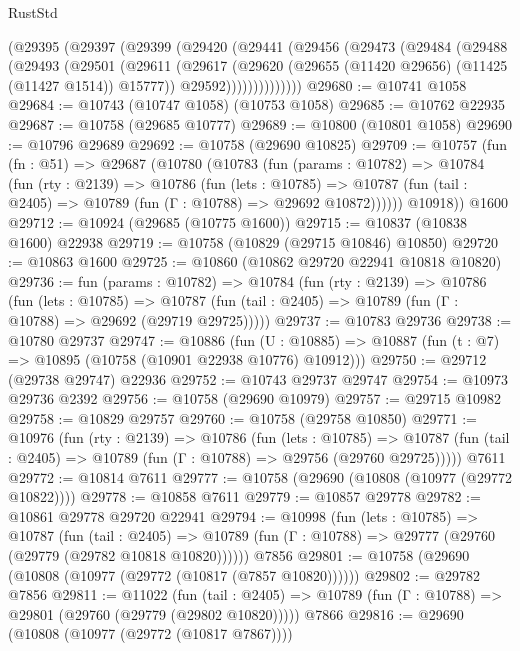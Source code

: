 \begin{lexlean}{RustStd}
\begin{coremodule}
      (@29395
        (@29397
          (@29399
            (@29420
              (@29441
                (@29456
                  (@29473
                    (@29484
                      (@29488
                        (@29493
                          (@29501
                            (@29611
                              (@29617
                                (@29620 (@29655 (@11420 @29656) (@11425 (@11427 @1514)) @15777))
                                @29592))))))))))))))
@29680 := @10741 @1058
@29684 := @10743 (@10747 @1058) (@10753 @1058)
@29685 := @10762 @22935
@29687 := @10758 (@29685 @10777)
@29689 := @10800 (@10801 @1058)
@29690 := @10796 @29689
@29692 := @10758 (@29690 @10825)
@29709 := @10757
    (fun (fn : @51) =>
    @29687
      (@10780
        (@10783
          (fun (params : @10782) =>
          @10784
            (fun (rty : @2139) =>
            @10786
              (fun (lets : @10785) =>
              @10787 (fun (tail : @2405) => @10789 (fun (Γ : @10788) => @29692 @10872))))))
        @10918))
    @1600
@29712 := @10924 (@29685 (@10775 @1600))
@29715 := @10837 (@10838 @1600) @22938
@29719 := @10758 (@10829 (@29715 @10846) @10850)
@29720 := @10863 @1600
@29725 := @10860 (@10862 @29720 @22941 @10818 @10820)
@29736 := fun (params : @10782) =>
  @10784
    (fun (rty : @2139) =>
    @10786
      (fun (lets : @10785) =>
      @10787 (fun (tail : @2405) => @10789 (fun (Γ : @10788) => @29692 (@29719 @29725)))))
@29737 := @10783 @29736
@29738 := @10780 @29737
@29747 := @10886
    (fun (U : @10885) => @10887 (fun (t : @7) => @10895 (@10758 (@10901 @22938 @10776) @10912)))
@29750 := @29712 (@29738 @29747) @22936
@29752 := @10743 @29737 @29747
@29754 := @10973 @29736 @2392
@29756 := @10758 (@29690 @10979)
@29757 := @29715 @10982
@29758 := @10829 @29757
@29760 := @10758 (@29758 @10850)
@29771 := @10976
    (fun (rty : @2139) =>
    @10786
      (fun (lets : @10785) =>
      @10787 (fun (tail : @2405) => @10789 (fun (Γ : @10788) => @29756 (@29760 @29725)))))
    @7611
@29772 := @10814 @7611
@29777 := @10758 (@29690 (@10808 (@10977 (@29772 @10822))))
@29778 := @10858 @7611
@29779 := @10857 @29778
@29782 := @10861 @29778 @29720 @22941
@29794 := @10998
    (fun (lets : @10785) =>
    @10787
      (fun (tail : @2405) =>
      @10789 (fun (Γ : @10788) => @29777 (@29760 (@29779 (@29782 @10818 @10820))))))
    @7856
@29801 := @10758 (@29690 (@10808 (@10977 (@29772 (@10817 (@7857 @10820))))))
@29802 := @29782 @7856
@29811 := @11022
    (fun (tail : @2405) => @10789 (fun (Γ : @10788) => @29801 (@29760 (@29779 (@29802 @10820)))))
    @7866
@29816 := @29690 (@10808 (@10977 (@29772 (@10817 @7867))))

\end{coremodule}
\end{lexlean}

